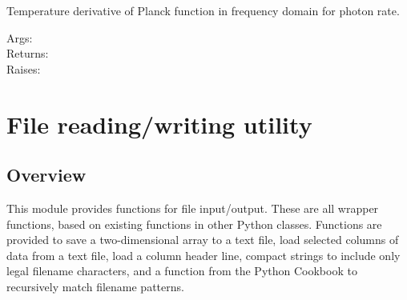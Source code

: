 \documentclass[a4paper,10pt,english]{sphinxmanual}
\begin{document}
\begin{fulllineitems}
\label{ryplanck:pyradi.ryplanck.dplnckqf}
Temperature derivative of Planck function in frequency domain for photon rate.
\begin{description}
\item[{Args:}] \leavevmode
{}

\item[{Returns:}] \leavevmode
{}

\item[{Raises:}] \leavevmode
{}

\end{description}

\end{fulllineitems}



\chapter{File reading/writing utility}
\label{ryfiles:file-reading-writing-utility}\label{ryfiles::doc}

\section{Overview}
\label{ryfiles:module-pyradi.ryfiles}\label{ryfiles:overview}
This module provides functions for file input/output. These are all wrapper
functions, based on existing functions in other Python classes. Functions are 
provided to save a two-dimensional array to a text file, load selected columns 
of data from a text file, load a column header line, compact strings to include 
only legal filename characters, and a function from the Python Cookbook to 
recursively match filename patterns.
\end{document}
